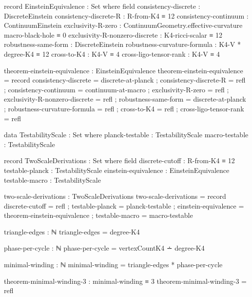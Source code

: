 \documentclass[11pt,a4paper]{book}
\begin{document}
\begin{code}
record EinsteinEquivalence : Set where
  field
    consistency-discrete : DiscreteEinstein
    consistency-discrete-R : R-from-K4 ≡ 12
    consistency-continuum : ContinuumEinstein
    exclusivity-R-zero : ContinuumGeometry.effective-curvature macro-black-hole ≡ 0
    exclusivity-R-nonzero-discrete : K4-ricci-scalar ≡ 12
    robustness-same-form : DiscreteEinstein
    robustness-curvature-formula : K4-V * degree-K4 ≡ 12
    cross-to-K4 : K4-V ≡ 4
    cross-ligo-tensor-rank : K4-V ≡ 4

\end{code}

\begin{code}
theorem-einstein-equivalence : EinsteinEquivalence
theorem-einstein-equivalence = record
  { consistency-discrete = discrete-at-planck
  ; consistency-discrete-R = refl
  ; consistency-continuum = continuum-at-macro
  ; exclusivity-R-zero = refl
  ; exclusivity-R-nonzero-discrete = refl
  ; robustness-same-form = discrete-at-planck
  ; robustness-curvature-formula = refl
  ; cross-to-K4 = refl
  ; cross-ligo-tensor-rank = refl
  }

\end{code}

\begin{code}
data TestabilityScale : Set where
  planck-testable : TestabilityScale
  macro-testable : TestabilityScale

record TwoScaleDerivations : Set where
  field
    discrete-cutoff : R-from-K4 ≡ 12
    testable-planck : TestabilityScale
    einstein-equivalence : EinsteinEquivalence
    testable-macro : TestabilityScale

two-scale-derivations : TwoScaleDerivations
two-scale-derivations = record
  { discrete-cutoff = refl
  ; testable-planck = planck-testable
  ; einstein-equivalence = theorem-einstein-equivalence
  ; testable-macro = macro-testable
  }
\end{code}

\begin{code}
triangle-edges : ℕ
triangle-edges = degree-K4

phase-per-cycle : ℕ
phase-per-cycle = vertexCountK4 ∸ degree-K4

minimal-winding : ℕ
minimal-winding = triangle-edges * phase-per-cycle

theorem-minimal-winding-3 : minimal-winding ≡ 3
theorem-minimal-winding-3 = refl
\end{code}
\end{document}
